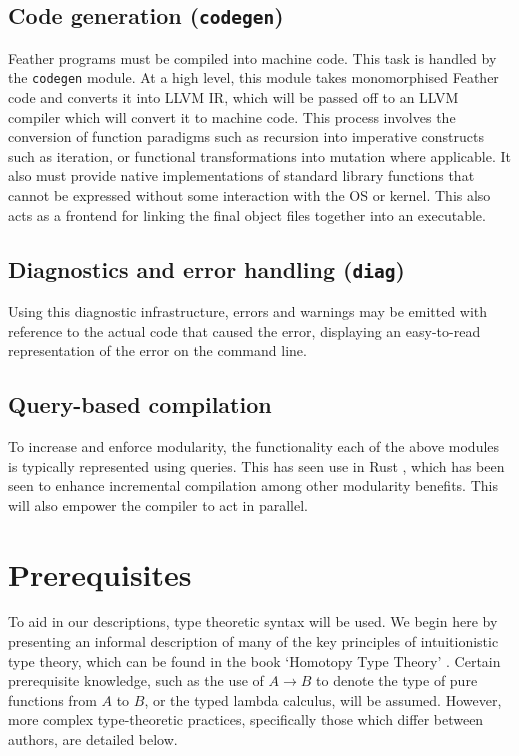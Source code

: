 \documentclass[UKenglish, 11pt, a4paper, parskip=half]{scrbook}
\newcommand{\code}[1]{\lstinline{#1}}
\theoremstyle{definition}
\begin{document}
\subsection{Code generation (\code{codegen})}

Feather programs must be compiled into machine code.
This task is handled by the \code{codegen} module.
At a high level, this module takes monomorphised Feather code and converts it into LLVM IR, which will be passed off to an LLVM compiler which will convert it to machine code.
This process involves the conversion of function paradigms such as recursion into imperative constructs such as iteration, or functional transformations into mutation where applicable.
It also must provide native implementations of standard library functions that cannot be expressed without some interaction with the OS or kernel.
This also acts as a frontend for linking the final object files together into an executable.

\subsection{Diagnostics and error handling (\code{diag})}

Using this diagnostic infrastructure, errors and warnings may be emitted with reference to the actual code that caused the error, displaying an easy-to-read representation of the error on the command line.

\subsection{Query-based compilation}

To increase and enforce modularity, the functionality each of the above modules is typically represented using queries.
This has seen use in Rust \cite{RustDevGuideOverview}, which has been seen to enhance incremental compilation among other modularity benefits.
This will also empower the compiler to act in parallel.

\section{Prerequisites}

To aid in our descriptions, type theoretic syntax will be used.
We begin here by presenting an informal description of many of the key principles of intuitionistic type theory, which can be found in the book `Homotopy Type Theory' \cite{hottbook}.
Certain prerequisite knowledge, such as the use of \( A \to B \) to denote the type of pure functions from \( A \) to \( B \), or the typed lambda calculus, will be assumed.
However, more complex type-theoretic practices, specifically those which differ between authors, are detailed below.
\end{document}

